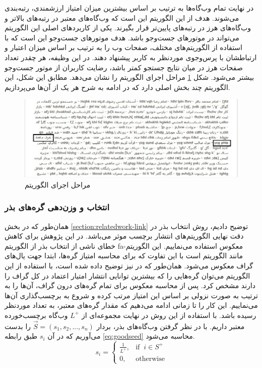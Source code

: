 \documentclass[twoside, a4paper,11pt]{book}
\numberwithin{equation}{chapter}
\numberwithin{table}{chapter}
\numberwithin{figure}{chapter}
\numberwithin{equation}{chapter}
\newcommand{\mls}[1]{\gls{fa-#1}\glsuseri{la-#1}}
\begin{document}
در نهایت تمام وب‌گاه‌ها به ترتیب بر اساس بیشترین میزان امتیاز ارزشمندی، رتبه‌بندی می‌شوند. هدف از این الگوریتم این است که وب‌گاه‌های معتبر در رتبه‌های بالاتر و وب‌گاه‌های هرز در رتبه‌های پایین‌تر  قرار بگیرند. یکی از کاربردهای اصلی این الگوریتم می‌تواند در موتورهای جست‌و‌جو باشد. هدف موتورهای جست‌و‌جو این است که با استفاده از الگوریتم‌های مختلف، صفحات وب را به ترتیب بر اساس میزان اعتبار و ارتباطشان با پرس‌وجوی موردنظر به کاربر پیشنهاد دهند. در این وظیفه، هر چقدر تعداد صفحات هرز در میان نتایج جستجو کمتر باشد، رضایت کاربران از موتور جست‌وجو بیشتر می‌شود. شکل \ref{fig:worthy} مراحل اجرای الگوریتم  را نشان می‌دهد. مطابق این شکل، این الگوریتم چند بخش اصلی دارد که در ادامه به شرح هر یک از آن‌ها می‌پردازیم.
\begin{figure}
\centering
\includegraphics[scale=0.65]{Figures/worthy.png}
\caption{\label{fig:worthy}
مراحل اجرای الگوریتم  
}
\end{figure}


\subsubsection{انتخاب و وزن‌دهی گره‌های بذر}
\label{section:linkbased-wp-seedweighting}
همان‌طور که در بخش \ref{section:relatedwork-link} توضیح دادیم، روش انتخاب بذر در دقت نهایی الگوریتم‌های انتشار برچسب موثر می‌باشد. در این پژوهش برای کاهش خطای ناشی از انتخاب بذر از الگوریتم  \mls{معکوس} استفاده می‌نماییم. این الگوریتم مانند الگوریتم  است با این تفاوت که برای محاسبه امتیاز گره‌ها، ابتدا جهت یال‌های گراف معکوس می‌شود. همان‌طور که در \cite{gyongyi2004combating} نیز توضیح داده شده است، با استفاده از این الگوریتم می‌توان گره‌هایی را که بیشترین توانایی انتشار امتیار اعتماد در کل گراف را دارند مشخص کرد. پس از محاسبه  معکوس برای تمام گره‌های درون گراف، آن‌ها را به ترتیب  به صورت نزولی بر اساس این امتیاز مرتب کرده و شروع به برچسب‌گذاری آن‌ها می‌نماییم. این کار را تا زمانی ادامه می‌دهیم که مقدار گره‌های معتبر، به تعداد موردنظر رسیده باشد.
با استفاده از این روش در نهایت  مجموعه‌ای از $L^+$ وب‌گاه‌ برچسب‌خورده معتبر داریم. با در نظر گرفتن وب‌گاه‌های بذر، بردار  $\vec{S} = (s_1, s_2, ..., s_n)$ را بدست می‌آوریم که در آن $s_i$ طبق رابطه \ref{eq:goodseed} محاسبه می‌شود.
\begin{equation}
\label{eq:goodseed}
  s_i =\begin{cases}
     \frac{1}{L^+} ,& \text{if} \; \;  i \in S^+\\
    0, & \text{otherwise}
  \end{cases}
\end{equation}
\end{document}

